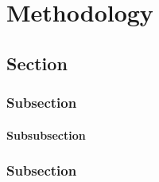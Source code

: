 


\chapter{Methodology}  

\section{Section}
\noindent \lipsum[1][1-3] %

\subsection{Subsection}
\noindent \lipsum[1][3-5] %

\subsubsection{Subsubsection}
\noindent \blindtext %

\subsection{Subsection}
\noindent \lipsum[1][2-5] %





